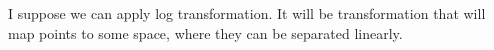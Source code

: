 \begin{answer}
I suppose we can apply log transformation. It will be transformation that will map points to some space, where they can be separated linearly.
\end{answer}
